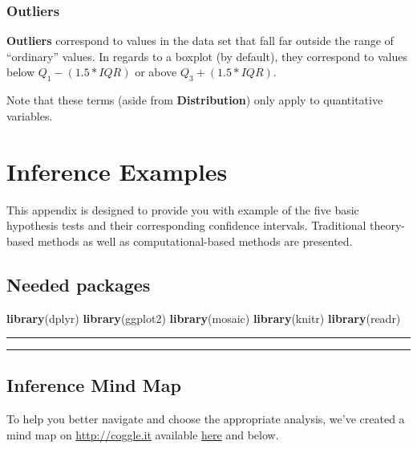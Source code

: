 \documentclass[]{tufte-book}
\newenvironment{Shaded}{\begin{snugshade}}{\end{snugshade}}
\newcommand{\KeywordTok}[1]{\textcolor[rgb]{0.13,0.29,0.53}{\textbf{{#1}}}}
\newcommand{\NormalTok}[1]{{#1}}
\let\oldrule=\rule
\renewcommand{\rule}[1]{\oldrule{\linewidth}}
\theoremstyle{definition}
\theoremstyle{definition}
\theoremstyle{remark}
\begin{document}
\subsection{Outliers}\label{outliers}

\textbf{Outliers} correspond to values in the data set that fall far
outside the range of ``ordinary'' values. In regards to a boxplot (by
default), they correspond to values below \(Q_1 - (1.5 * IQR)\) or above
\(Q_3 + (1.5 * IQR)\).

Note that these terms (aside from \textbf{Distribution}) only apply to
quantitative variables.

\chapter{Inference Examples}\label{appendixB}

This appendix is designed to provide you with example of the five basic
hypothesis tests and their corresponding confidence intervals.
Traditional theory-based methods as well as computational-based methods
are presented.

\section*{Needed packages}\label{needed-packages-7}

\begin{Shaded}
\begin{Highlighting}[]
\KeywordTok{library}\NormalTok{(dplyr)}
\KeywordTok{library}\NormalTok{(ggplot2)}
\KeywordTok{library}\NormalTok{(mosaic)}
\KeywordTok{library}\NormalTok{(knitr)}
\KeywordTok{library}\NormalTok{(readr)}
\end{Highlighting}
\end{Shaded}

\begin{center}\rule{0.5\linewidth}{\linethickness}\end{center}

\begin{center}\rule{0.5\linewidth}{\linethickness}\end{center}

\section{Inference Mind Map}\label{inference-mind-map}

To help you better navigate and choose the appropriate analysis, we've
created a mind map on \url{http://coggle.it} available
\href{https://coggle.it/diagram/Vxlydu1akQFeqo6-}{here} and below.
\end{document}
